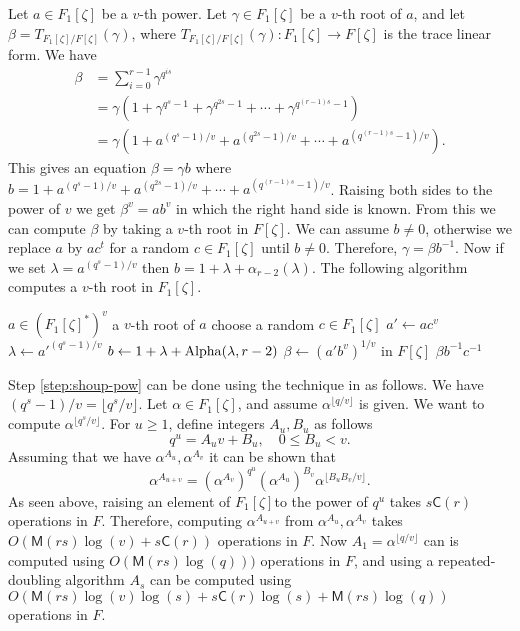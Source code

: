 \documentclass[12pt]{article}
\theoremstyle{plain}
\theoremstyle{definition}
\def\MM{\ensuremath{\mathsf{M}}}
\def\CC{\ensuremath{\mathsf{C}}}
\newcounter{algorithm}
\begin{document}
Let $a \in F_1[\zeta]$ be a $v$-th power. Let $\gamma \in F_1[\zeta]$ be a $v$-th root of $a$, and 
let $\beta = T_{F_1[\zeta] / F[\zeta]}(\gamma)$, where $T_{F_1[\zeta] / F[\zeta]}(\gamma): 
F_1[\zeta] \to F[\zeta]$ is the trace linear form. We have
\begin{align*}
\label{equation:tr-square}
\beta 
& = \sum_{i = 0}^{r - 1} \gamma^{q^{is}} \\
& = \gamma(1 + \gamma^{q^s - 1} + \gamma^{q^{2s} - 1} + \cdots + \gamma^{q^{(r - 1)s} - 1}) \\
& = \gamma(1 + a^{(q^s - 1) / v} + a^{(q^{2s} - 1) / v} + \cdots + a^{(q^{(r - 1)s} -1) / v}).
\end{align*}
This gives an equation $\beta = \gamma b$ where $b = 1 + a^{(q^s - 1) / v} + a^{(q^{2s} - 1) / v} + 
\cdots + a^{(q^{(r - 1)s} -1) / v}$. Raising both sides to the power of $v$ we get $\beta^v = ab^v$ 
in which the right hand side is known. From this we can compute $\beta$ by taking a $v$-th root in 
$F[\zeta]$. We can assume $b \ne 0$, otherwise we replace $a$ by $ac^t$ for a random $c \in 
F_1[\zeta]$ until $b \ne 0$. Therefore, $\gamma = \beta b^{-1}$. Now if we set $\lambda =
a^{(q^s - 1) / v}$ then $b = 1 + \lambda + \alpha_{r - 2}(\lambda)$. The following algorithm 
computes a $v$-th root in $F_1[\zeta]$.

\begin{algorithm}
	[$t$-th root in ${F_1[\zeta]}$]
	\label{algorithm:root-F1z}
	\begin{algorithmic}[1]
		\REQUIRE $a \in (F_1[\zeta]^*)^v$
		\ENSURE a $v$-th root of $a$
		\REPEAT
		\STATE choose a random $c \in F_1[\zeta]$
		\STATE\label{step:root-rand} $a'\leftarrow ac^v$
		\STATE\label{step:shoup-pow} $\lambda \leftarrow {a'}^{(q^s-1)/v}$
		\STATE\label{step:b-tr} $b \leftarrow 1+\lambda+{\rm Alpha}(\lambda, r-2)$
		\STATE $\beta \leftarrow (a'b^v)^{1/v}$ in $F[\zeta]$
		\RETURN $\beta b^{-1}c^{-1}$
	\end{algorithmic}
\end{algorithm}

Step \ref{step:shoup-pow} can be done using the technique in \cite[Lemma 14]{shoup94} as follows. 
We have $(q^s-1)/v = \lfloor q^s / v \rfloor$. Let $\alpha \in F_1[\zeta]$, and assume 
$\alpha^{\lfloor q / v \rfloor}$ is given. We want to compute $\alpha^{\lfloor q^s / v \rfloor}$. 
For $u \ge 1$, define integers $A_u, B_u$ as follows
\[q^u = A_uv + B_u, \quad 0\le B_u < v.\]
Assuming that we have $\alpha^{A_u}, \alpha^{A_v}$ it can be shown that
\[ \alpha^{A_{u + v}} = 
\left(\alpha^{A_v}\right)^{q^u}\left(\alpha^{A_u}\right)^{B_v}\alpha^{\lfloor B_uB_v / v \rfloor}. 
\]
As seen above, raising an element of $F_1[\zeta]$to the power of $q^u$ takes $s\CC(r)$ operations 
in $F$. Therefore, computing $\alpha^{A_{u + v}}$ from $\alpha^{A_u}, \alpha^{A_v}$ takes 
$O(\MM(rs)\log(v) + s\CC(r))$ operations in $F$. Now $A_1 = \alpha^{\lfloor q / v \rfloor}$ can is 
computed using $O(\MM(rs)\log(q)))$ operations in $F$, and using a repeated-doubling algorithm 
$A_s$ can be computed using $O(\MM(rs)\log(v)\log(s) + s\CC(r)\log(s) + \MM(rs)\log(q))$ operations 
in $F$.
\end{document}
